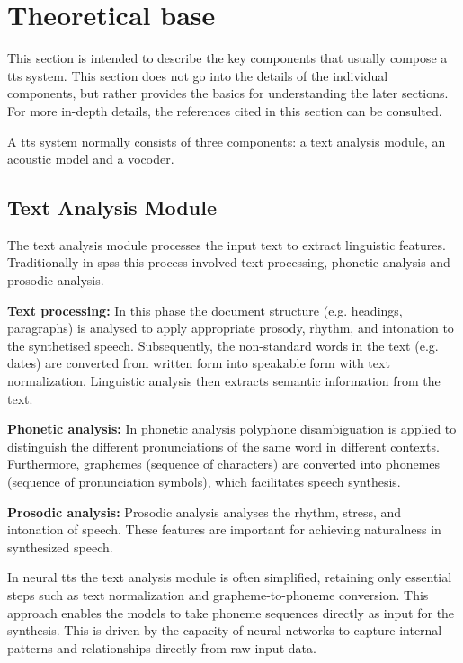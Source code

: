 \newpage
\section{Theoretical base}
This section is intended to describe the key components that usually compose a \gls{tts} system. This section does not go into the details of the individual components, but rather provides the basics for understanding the later sections. For more in-depth details, the references cited in this section can be consulted.

A \gls{tts} system normally consists of three components: a text analysis module, an acoustic model and a vocoder.

\subsection{Text Analysis Module}

The text analysis module processes the input text to extract linguistic features. Traditionally in \gls{spss} this process involved text processing, phonetic analysis and prosodic analysis\cite{Tan2023textanalysis}.

\textbf{Text processing:}
In this phase the document structure (e.g. headings, paragraphs) is analysed to apply appropriate prosody, rhythm, and intonation to the synthetised speech\cite{Tan2023textanalysis}. Subsequently, the non-standard words in the text (e.g. dates) are converted from written form into speakable form with text normalization\cite{Tan2023textanalysis, sproat2001normalization}. Linguistic analysis then extracts semantic information from the text\cite{Tan2023textanalysis}.

\textbf{Phonetic analysis:}
In phonetic analysis polyphone disambiguation is applied to distinguish the different pronunciations of the same word in different contexts. Furthermore, graphemes (sequence of characters) are converted into phonemes (sequence of pronunciation symbols), which facilitates speech synthesis\cite{Tan2023textanalysis, sun2019token}.

\textbf{Prosodic analysis:}
Prosodic analysis analyses the rhythm, stress, and intonation of speech. These features are important for achieving naturalness in synthesized speech\cite{Tan2023textanalysis}.

In neural \gls{tts} the text analysis module is often simplified, retaining only essential steps such as text normalization and grapheme-to-phoneme conversion. This approach enables the models to take phoneme sequences directly as input for the synthesis. This is driven by the capacity of neural networks to capture internal patterns and relationships directly from raw input data\cite{Tan2023textanalysis}.

